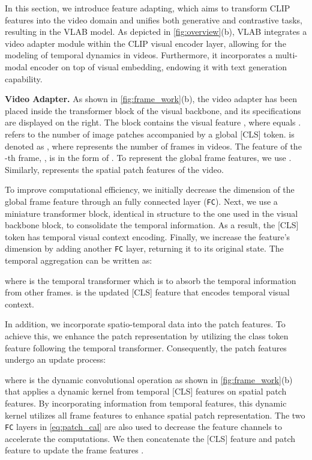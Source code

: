 \documentclass{article}
\begin{document}
In this section, we introduce feature adapting, which aims to transform CLIP features into the video domain and unifies both generative and contrastive tasks, resulting in the VLAB model.
As depicted in \cref{fig:overview}(b), VLAB integrates a video adapter module within the CLIP visual encoder layer, allowing for the modeling of temporal dynamics in videos. Furthermore, it incorporates a multi-modal encoder on top of visual embedding, endowing it with text generation capability. 

\noindent\textbf{Video Adapter.}
As shown in \cref{fig:frame_work}(b), the video adapter has been placed inside the transformer block of the visual backbone, and its specifications are displayed on the right. 
The  block contains the visual feature , where  equals .  refers to the number of image patches accompanied by a global [CLS] token.  is denoted as , where  represents the number of frames in videos. The feature of the -th frame, , is in the form of . To represent the global frame features, we use . Similarly,  represents the spatial patch features of the video.

To improve computational efficiency, we initially decrease the dimension of the global frame feature  through an fully connected layer (\texttt{FC}). Next, we use a miniature transformer block, identical in structure to the one used in the visual backbone block, to consolidate the temporal information. As a result, the [CLS] token has temporal visual context encoding. Finally, we increase the feature's dimension by adding another \texttt{FC} layer, returning it to its original state.  The temporal aggregation can be written as:

where  is the temporal transformer which is to absorb the temporal information from other frames.  is the updated [CLS] feature that encodes temporal visual context.

In addition, we incorporate spatio-temporal data into the patch features. To achieve this, we enhance the patch representation by utilizing the class token feature following the temporal transformer. Consequently, the patch features undergo an update process: 

where  is the dynamic convolutional operation as shown in \cref{fig:frame_work}(b) that applies a dynamic kernel from temporal [CLS] features on spatial patch features. By incorporating information from temporal features, this dynamic kernel utilizes all frame features to enhance spatial patch representation. The two \texttt{FC} layers in \cref{eq:patch_cal} are also used to decrease the feature channels to accelerate the computations.
We then concatenate the [CLS] feature and patch feature to update the frame features . 
\end{document}
